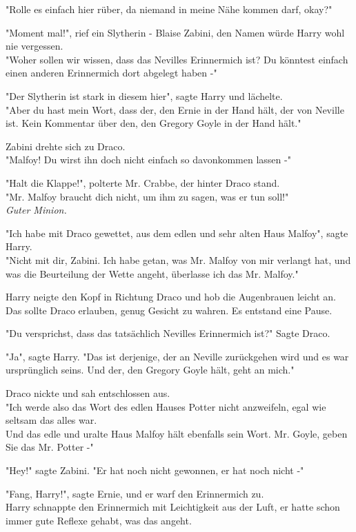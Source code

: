 {"Rolle es einfach hier rüber, da niemand in meine Nähe kommen darf, okay?"

"Moment mal!", rief ein Slytherin - Blaise Zabini, den Namen würde Harry wohl nie vergessen.\\ "Woher sollen wir wissen, dass das Nevilles Erinnermich ist? Du könntest einfach einen anderen Erinnermich dort abgelegt haben -"

"Der Slytherin ist stark in diesem hier", sagte Harry und lächelte.\\ "Aber du hast mein Wort, dass der, den Ernie in der Hand hält, der von Neville ist. Kein Kommentar über den, den Gregory Goyle in der Hand hält."

Zabini drehte sich zu Draco.\\ "Malfoy! Du wirst ihn doch nicht einfach so davonkommen lassen -"

"Halt die Klappe!", polterte Mr. Crabbe, der hinter Draco stand.\\ "Mr. Malfoy braucht dich nicht, um ihm zu sagen, was er tun soll!"\\ \emph{Guter Minion.}

"Ich habe mit Draco gewettet, aus dem edlen und sehr alten Haus Malfoy", sagte Harry.\\ "Nicht mit dir, Zabini. Ich habe getan, was Mr. Malfoy von mir verlangt hat, und was die Beurteilung der Wette angeht, überlasse ich das Mr. Malfoy."

Harry neigte den Kopf in Richtung Draco und hob die Augenbrauen leicht an. Das sollte Draco erlauben, genug Gesicht zu wahren. Es entstand eine Pause.

"Du versprichst, dass das tatsächlich Nevilles Erinnermich ist?" Sagte Draco.

"Ja", sagte Harry. "Das ist derjenige, der an Neville zurückgehen wird und es war ursprünglich seins. Und der, den Gregory Goyle hält, geht an mich."

Draco nickte und sah entschlossen aus.\\ "Ich werde also das Wort des edlen Hauses Potter nicht anzweifeln, egal wie seltsam das alles war.\\ Und das edle und uralte Haus Malfoy hält ebenfalls sein Wort. Mr. Goyle, geben Sie das Mr. Potter -"

"Hey!" sagte Zabini. "Er hat noch nicht gewonnen, er hat noch nicht -"

"Fang, Harry!", sagte Ernie, und er warf den Erinnermich zu.\\ Harry schnappte den Erinnermich mit Leichtigkeit aus der Luft, er hatte schon immer gute Reflexe gehabt, was das angeht.

}
